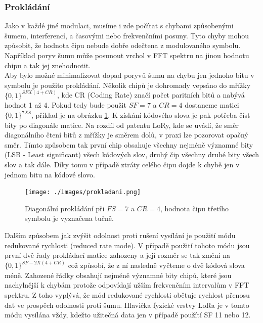 \documentclass{ctuthesis}
\begin{document}
\subsubsection{Prokládání}
Jako v každé jiné modulaci, musíme i zde počítat s chybami způsobenými šumem, interferencí, a časovými nebo frekvenčními posuny. Tyto chyby mohou způsobit, že hodnota čipu nebude dobře odečtena z modulovaného symbolu. Například poryv šumu může posunout vrchol v FFT spektru na jinou hodnotu chipu a tak jej znehodnotit.\\
Aby bylo možné minimalizovat dopad poryvů šumu na chybu jen jednoho bitu v symbolu je použito prokládání. Několik chipů je dohromady vepsáno do mřížky $\{0,1\}^{SF X (4 + CR)}$, kde CR (Coding Rate) značí počet paritních bitů a nabývá hodnot 1 až 4. Pokud tedy bude použit $SF = 7$ a $CR =4$ dostaneme matici  $\{0,1\}^{7 X 8}$, příklad je na obrázku \ref{fig:lora1}. K získání kódového slova je pak potřeba číst bity po diagonále matice. Na rozdíl od patentu LoRy, kde se uvádí, že směr diagonálního čtení bitů z mřížky je směrem dolů, v praxi lze pozorovat opačný směr. Tímto způsobem tak první chip obsahuje všechny nejméně významné bity (LSB - Least significant) všech kódových slov, druhý čip všechny druhé bity všech slov a tak dále. Díky tomu v případě ztráty celého čipu dojde k chybě jen v jednom bitu na kódové slovo.\\
\begin{figure}
\caption{Diagonální prokládání při $FS=7$ a $CR =4$, hodnota čipu třetího symbolu je vyznačena tučně.   \cite{gr-lora2018}}
\texttt{[image: ./images/prokladani.png]}
\label{fig:lora1}
\end{figure}
Dalším způsobem jak zvýšit odolnost proti rušení vysílání je použití módu redukované rychlosti (reduced rate mode). V případě použití tohoto módu jsou první dvě řady prokládací matice zahozeny a její rozměr se tak změní na $\{0,1\}^{SF-2 X (4 + CR)}$ což způsobí, že z ní nasledně vyčteme o dvě kódová slova méně. Zahozené řádky obsahují nejméně významné bity chipů, které jsou nachylnější k chybám protože odpovídají užším frekvenčním intervalům v FFT spektru. Z toho vyplývá, že mód redukované rychlosti obětuje rychlost přenosu dat ve prospěch odolnosti proti šumu. Hlavička fyzické vrstvy LoRa je v tomto módu vysílána vždy, kdežto užitečná data jen v případě použítí SF 11 nebo 12.
\end{document}

